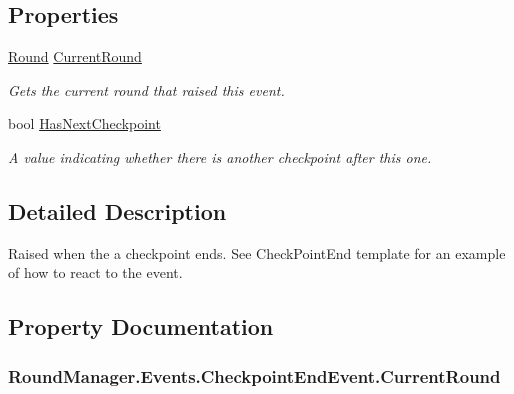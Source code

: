 \subsection*{Properties}
\begin{DoxyCompactItemize}
\item 
\hyperlink{class_round_manager_1_1_round}{Round} \hyperlink{class_round_manager_1_1_events_1_1_checkpoint_end_event_a2a39644ca55e8a76302f27cffc848366}{Current\+Round}
\begin{DoxyCompactList}\small\item\em Gets the current round that raised this event. \end{DoxyCompactList}\item 
bool \hyperlink{class_round_manager_1_1_events_1_1_checkpoint_end_event_a882ecd882a8c5c5824450d29c4d4e43f}{Has\+Next\+Checkpoint}
\begin{DoxyCompactList}\small\item\em A value indicating whether there is another checkpoint after this one. \end{DoxyCompactList}\end{DoxyCompactItemize}


\subsection{Detailed Description}
Raised when the a checkpoint ends. See Check\+Point\+End template for an example of how to react to the event. 



\subsection{Property Documentation}
\hypertarget{class_round_manager_1_1_events_1_1_checkpoint_end_event_a2a39644ca55e8a76302f27cffc848366}{}
\subsubsection[{Current\+Round}]{ Round\+Manager.\+Events.\+Checkpoint\+End\+Event.\+Current\+Round\hspace{0.3cm}{\ttfamily [get]}}\label{class_round_manager_1_1_events_1_1_checkpoint_end_event_a2a39644ca55e8a76302f27cffc848366}


